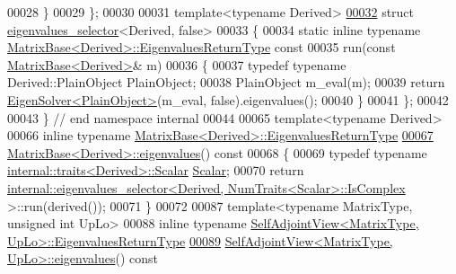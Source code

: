 \begin{DoxyCode}
00028   \}
00029 \};
00030 
00031 \textcolor{keyword}{template}<\textcolor{keyword}{typename} Derived>
\hyperlink{struct_eigen_1_1internal_1_1eigenvalues__selector_3_01_derived_00_01false_01_4}{00032} \textcolor{keyword}{struct }\hyperlink{struct_eigen_1_1internal_1_1eigenvalues__selector}{eigenvalues\_selector}<Derived, false>
00033 \{
00034   \textcolor{keyword}{static} \textcolor{keyword}{inline} \textcolor{keyword}{typename} \hyperlink{group___core___module_class_eigen_1_1_matrix}{MatrixBase<Derived>::EigenvaluesReturnType}
       \textcolor{keyword}{const}
00035   run(\textcolor{keyword}{const} \hyperlink{group___core___module_class_eigen_1_1_matrix_base}{MatrixBase<Derived>}& m)
00036   \{
00037     \textcolor{keyword}{typedef} \textcolor{keyword}{typename} Derived::PlainObject PlainObject;
00038     PlainObject m\_eval(m);
00039     \textcolor{keywordflow}{return} \hyperlink{group___eigenvalues___module_class_eigen_1_1_eigen_solver}{EigenSolver<PlainObject>}(m\_eval, \textcolor{keyword}{false}).eigenvalues();
00040   \}
00041 \};
00042 
00043 \} \textcolor{comment}{// end namespace internal}
00044 
00065 \textcolor{keyword}{template}<\textcolor{keyword}{typename} Derived>
00066 \textcolor{keyword}{inline} \textcolor{keyword}{typename} \hyperlink{group___core___module_class_eigen_1_1_matrix}{MatrixBase<Derived>::EigenvaluesReturnType}
\hyperlink{group___core___module_a30430fa3d5b4e74d312fd4f502ac984d}{00067} \hyperlink{group___core___module_a30430fa3d5b4e74d312fd4f502ac984d}{MatrixBase<Derived>::eigenvalues}()\textcolor{keyword}{ const}
00068 \textcolor{keyword}{}\{
00069   \textcolor{keyword}{typedef} \textcolor{keyword}{typename} \hyperlink{struct_eigen_1_1internal_1_1traits}{internal::traits<Derived>::Scalar} 
      \hyperlink{group___core___module_a5feed465b3a8e60c47e73ecce83e39a2}{Scalar};
00070   \textcolor{keywordflow}{return} \hyperlink{struct_eigen_1_1internal_1_1eigenvalues__selector}{internal::eigenvalues\_selector<Derived, NumTraits<Scalar>::IsComplex}
      >::run(derived());
00071 \}
00072 
00087 \textcolor{keyword}{template}<\textcolor{keyword}{typename} MatrixType, \textcolor{keywordtype}{unsigned} \textcolor{keywordtype}{int} UpLo> 
00088 \textcolor{keyword}{inline} \textcolor{keyword}{typename} \hyperlink{group___core___module_class_eigen_1_1_matrix}{SelfAdjointView<MatrixType, UpLo>::EigenvaluesReturnType}
\hyperlink{group___core___module_ad4f34424b4ea12de9bbc5623cb938b4f}{00089} \hyperlink{group___core___module_ad4f34424b4ea12de9bbc5623cb938b4f}{SelfAdjointView<MatrixType, UpLo>::eigenvalues}()\textcolor{keyword}{ const}

\end{DoxyCode}

